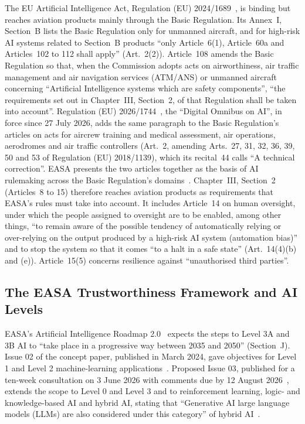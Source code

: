 \documentclass{aer}
\begin{document}
The EU Artificial Intelligence Act, Regulation (EU) 2024/1689~\citep{euaiact2024}, is binding but reaches aviation products mainly through the Basic Regulation. Its Annex~I, Section~B lists the Basic Regulation only for unmanned aircraft, and for high-risk AI systems related to Section~B products ``only Article~6(1), Article~60a and Articles~102 to 112 shall apply'' (Art.~2(2)). Article~108 amends the Basic Regulation so that, when the Commission adopts acts on airworthiness, air traffic management and air navigation services (ATM/ANS) or unmanned aircraft concerning ``Artificial Intelligence systems which are safety components'', ``the requirements set out in Chapter~III, Section~2, of that Regulation shall be taken into account''. Regulation (EU) 2026/1744~\citep{eu2026omnibus}, the ``Digital Omnibus on AI'', in force since 27 July 2026, adds the same paragraph to the Basic Regulation's articles on acts for aircrew training and medical assessment, air operations, aerodromes and air traffic controllers (Art.~2, amending Arts.~27, 31, 32, 36, 39, 50 and 53 of Regulation (EU) 2018/1139), which its recital~44 calls ``A technical correction''. EASA presents the two articles together as the basis of AI rulemaking across the Basic Regulation's domains~\citeyearpar[slide~21]{easa2026aidays}. Chapter~III, Section~2 (Articles~8 to 15) therefore reaches aviation products as requirements that EASA's rules must take into account. It includes Article~14 on human oversight, under which the people assigned to oversight are to be enabled, among other things, ``to remain aware of the possible tendency of automatically relying or over-relying on the output produced by a high-risk AI system (automation bias)'' and to stop the system so that it comes ``to a halt in a safe state'' (Art.~14(4)(b) and (e)). Article~15(5) concerns resilience against ``unauthorised third parties''.

\subsection{The EASA Trustworthiness Framework and AI Levels}\label{sec:levels}

EASA's Artificial Intelligence Roadmap 2.0~\citeyearpar{easa2023roadmap} expects the steps to Level 3A and 3B AI to ``take place in a progressive way between 2035 and 2050'' (Section~J). Issue 02 of the concept paper, published in March 2024, gave objectives for Level 1 and Level 2 machine-learning applications~\citep{easa2024concept}. Proposed Issue 03, published for a ten-week consultation on 3 June 2026 with comments due by 12 August 2026~\citep{easa2026news}, extends the scope to Level 0 and Level 3 and to reinforcement learning, logic- and knowledge-based AI and hybrid AI, stating that ``Generative AI large language models (LLMs) are also considered under this category'' of hybrid AI~\citep[Section~B.1]{easa2026concept}.
\end{document}
